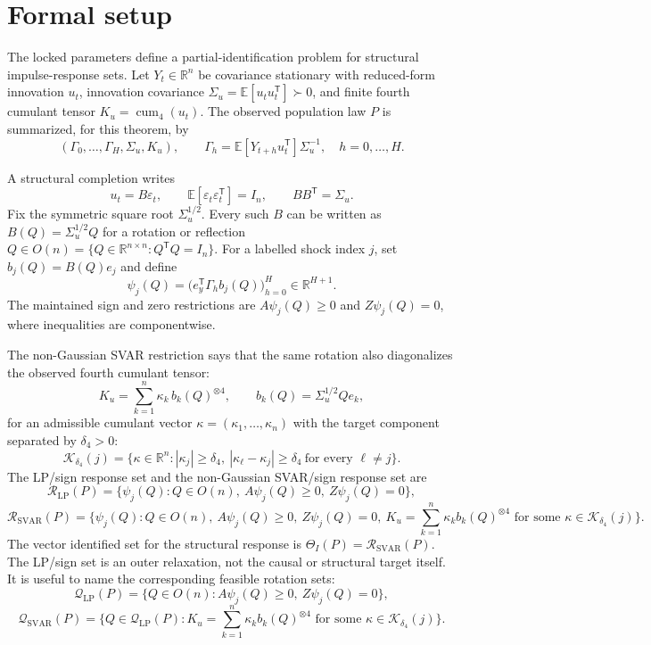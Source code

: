 \documentclass[11pt]{article}
\newcommand{\E}{\mathbb{E}}
\newcommand{\transpose}{\mathsf{T}}
\newcommand{\R}{\mathbb{R}}
\theoremstyle{definition}
\theoremstyle{plain}
\theoremstyle{remark}
\begin{document}
\section{Formal setup}
The locked parameters define a partial-identification problem for structural
impulse-response sets.  Let \(Y_t\in\R^n\) be covariance stationary with
reduced-form innovation \(u_t\), innovation covariance
\(\Sigma_u=\E[u_tu_t^\transpose]\succ0\), and finite fourth cumulant tensor
\(K_u=\operatorname{cum}_4(u_t)\).  The observed population law \(P\) is
summarized, for this theorem, by
\[
(\Gamma_0,\ldots,\Gamma_H,\Sigma_u,K_u),\qquad
\Gamma_h=\E[Y_{t+h}u_t^\transpose]\Sigma_u^{-1},\quad h=0,\ldots,H.
\]

A structural completion writes
\[
u_t=B\varepsilon_t,\qquad \E[\varepsilon_t\varepsilon_t^\transpose]=I_n,
\qquad BB^\transpose=\Sigma_u.
\]
Fix the symmetric square root \(\Sigma_u^{1/2}\).  Every such \(B\) can be
written as \(B(Q)=\Sigma_u^{1/2}Q\) for a rotation or reflection
\(Q\in O(n)=\{Q\in\R^{n\times n}:Q^\transpose Q=I_n\}\).  For a labelled shock
index \(j\), set \(b_j(Q)=B(Q)e_j\) and define
\[
\psi_j(Q)=\bigl(e_y^\transpose\Gamma_h b_j(Q)\bigr)_{h=0}^H
        \in\R^{H+1}.
\]
The maintained sign and zero restrictions are \(A\psi_j(Q)\ge0\) and
\(Z\psi_j(Q)=0\), where inequalities are componentwise.

The non-Gaussian SVAR restriction says that the same rotation also diagonalizes
the observed fourth cumulant tensor:
\[
K_u=\sum_{k=1}^n \kappa_k\, b_k(Q)^{\otimes4},
\qquad b_k(Q)=\Sigma_u^{1/2}Qe_k,
\]
for an admissible cumulant vector \(\kappa=(\kappa_1,\ldots,\kappa_n)\) with
the target component separated by \(\delta_4>0\):
\[
\mathcal K_{\delta_4}(j)=
\{\kappa\in\R^n: |\kappa_j|\ge\delta_4,\ 
|\kappa_\ell-\kappa_j|\ge\delta_4\ \text{for every }\ell\ne j\}.
\]
The LP/sign response set and the non-Gaussian SVAR/sign response set are
\[
\mathcal R_{\mathrm{LP}}(P)=
\{\psi_j(Q):Q\in O(n),\ A\psi_j(Q)\ge0,\ Z\psi_j(Q)=0\},
\]
\[
\mathcal R_{\mathrm{SVAR}}(P)=
\{\psi_j(Q):Q\in O(n),\ A\psi_j(Q)\ge0,\ Z\psi_j(Q)=0,\ 
K_u=\sum_{k=1}^n\kappa_k b_k(Q)^{\otimes4}
\text{ for some }\kappa\in\mathcal K_{\delta_4}(j)\}.
\]
The vector identified set for the structural response is
\(\Theta_I(P)=\mathcal R_{\mathrm{SVAR}}(P)\).  The LP/sign set is an outer
relaxation, not the causal or structural target itself.
It is useful to name the corresponding feasible rotation sets:
\[
\mathcal Q_{\mathrm{LP}}(P)=
\{Q\in O(n):A\psi_j(Q)\ge0,\ Z\psi_j(Q)=0\},
\]
\[
\mathcal Q_{\mathrm{SVAR}}(P)=
\{Q\in\mathcal Q_{\mathrm{LP}}(P):
K_u=\sum_{k=1}^n\kappa_k b_k(Q)^{\otimes4}
\text{ for some }\kappa\in\mathcal K_{\delta_4}(j)\}.
\]
\end{document}
